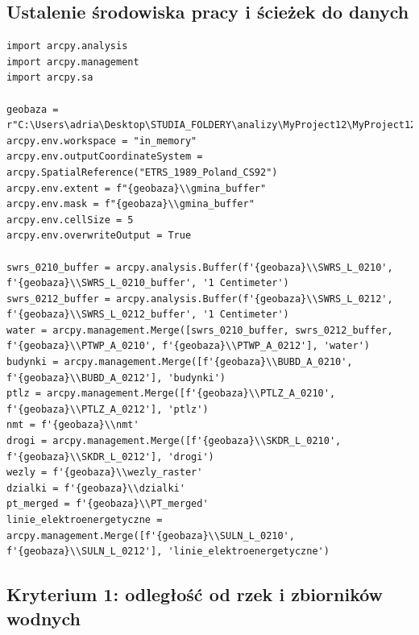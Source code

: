 \documentclass{article}
\begin{document}
\subsection{Ustalenie środowiska pracy i ścieżek do danych}
\begin{lstlisting}
import arcpy.analysis
import arcpy.management
import arcpy.sa

geobaza = r"C:\Users\adria\Desktop\STUDIA_FOLDERY\analizy\MyProject12\MyProject12.gdb"
arcpy.env.workspace = "in_memory"
arcpy.env.outputCoordinateSystem = arcpy.SpatialReference("ETRS_1989_Poland_CS92")
arcpy.env.extent = f"{geobaza}\\gmina_buffer"
arcpy.env.mask = f"{geobaza}\\gmina_buffer"
arcpy.env.cellSize = 5
arcpy.env.overwriteOutput = True

swrs_0210_buffer = arcpy.analysis.Buffer(f'{geobaza}\\SWRS_L_0210', f'{geobaza}\\SWRS_L_0210_buffer', '1 Centimeter')
swrs_0212_buffer = arcpy.analysis.Buffer(f'{geobaza}\\SWRS_L_0212', f'{geobaza}\\SWRS_L_0212_buffer', '1 Centimeter')
water = arcpy.management.Merge([swrs_0210_buffer, swrs_0212_buffer, f'{geobaza}\\PTWP_A_0210', f'{geobaza}\\PTWP_A_0212'], 'water')
budynki = arcpy.management.Merge([f'{geobaza}\\BUBD_A_0210', f'{geobaza}\\BUBD_A_0212'], 'budynki')
ptlz = arcpy.management.Merge([f'{geobaza}\\PTLZ_A_0210', f'{geobaza}\\PTLZ_A_0212'], 'ptlz')
nmt = f'{geobaza}\\nmt'
drogi = arcpy.management.Merge([f'{geobaza}\\SKDR_L_0210', f'{geobaza}\\SKDR_L_0212'], 'drogi')
wezly = f'{geobaza}\\wezly_raster'
dzialki = f'{geobaza}\\dzialki'
pt_merged = f'{geobaza}\\PT_merged'
linie_elektroenergetyczne = arcpy.management.Merge([f'{geobaza}\\SULN_L_0210', f'{geobaza}\\SULN_L_0212'], 'linie_elektroenergetyczne')
\end{lstlisting}
\newpage
\subsection{Kryterium 1: odległość od rzek i zbiorników wodnych}
\end{document}
